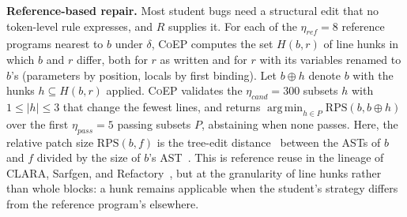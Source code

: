 \documentclass[acmsmall,screen,review,anonymous,nonacm]{acmart}
\DeclareMathOperator*{\argmin}{arg\,min}
\newcommand{\tool}{\textsc{CoEP}\xspace}
\newcommand{\V}[1]{\ensuremath{\mathit{#1}}}
\newcommand{\RPS}{\mathrm{RPS}}
\begin{document}
\textbf{Reference-based repair.} Most student bugs need a structural edit that no token-level rule expresses, and $R$ supplies it. For each of the $\eta_{\V{ref}} = 8$ reference programs nearest to $b$ under $\delta$, \tool computes the set $H(b, r)$ of line hunks in which $b$ and $r$ differ, both for $r$ as written and for $r$ with its variables renamed to $b$'s (parameters by position, locals by first binding). Let $b \oplus h$ denote $b$ with the hunks $h \subseteq H(b, r)$ applied. \tool validates the $\eta_{\V{cand}} = 300$ subsets $h$ with $1 \le |h| \le 3$ that change the fewest lines, and returns $\argmin_{h \in P} \RPS(b, b \oplus h)$ over the first $\eta_{\V{pass}} = 5$ passing subsets $P$, abstaining when none passes. Here, the relative patch size $\RPS(b, f)$ is the tree-edit distance~\cite{zhang1989simple} between the ASTs of $b$ and $f$ divided by the size of $b$'s AST~\cite{hu2019re}. This is reference reuse in the lineage of CLARA, Sarfgen, and Refactory~\cite{gulwani2018automated,wang2018search,hu2019re}, but at the granularity of line hunks rather than whole blocks: a hunk remains applicable when the student's strategy differs from the reference program's elsewhere.
\end{document}
